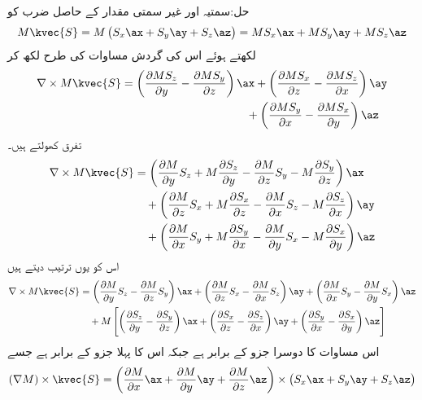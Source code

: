 حل:سمتیہ اور غیر سمتی مقدار کے حاصل ضرب کو
\begin{align*}
M \kvec{S}=M\left(S_x\ax+S_y\ay+S_z\az \right)=M S_x\ax+M S_y\ay+M S_z\az
\end{align*}
لکھتے ہوئے اس کی گردش مساوات  کی طرح لکھ کر
\begin{equation*}
\begin{split}
\nabla \times M\kvec{S}&=\left(\frac{\partial MS_z}{\partial y}-\frac{\partial MS_y}{\partial z} \right)\ax+\left( \frac{\partial MS_x}{\partial z}-\frac{\partial MS_z}{\partial x}\right)\ay \\
& \quad \quad \quad\quad \quad \quad\quad \quad \quad\quad \quad +\left(\frac{\partial MS_y}{\partial x}-\frac{\partial MS_x}{\partial y} \right)\az
\end{split}
\end{equation*}
تفرق کھولتے ہیں۔
\begin{align*}
\nabla \times M\kvec{S}&=\left(\frac{\partial M}{\partial y}S_z+M\frac{\partial S_z}{\partial y}-\frac{\partial M}{\partial z}S_y-M\frac{\partial S_y}{\partial z} \right)\ax\\
&\quad +\left( \frac{\partial M}{\partial z}S_x+M\frac{\partial S_x}{\partial z}-\frac{\partial M}{\partial x}S_z-M\frac{\partial S_z}{\partial x}\right)\ay \\
&\quad +\left(\frac{\partial M}{\partial x}S_y+M\frac{\partial S_y}{\partial x}-\frac{\partial M}{\partial y}S_x-M\frac{\partial S_x}{\partial y} \right)\az
\end{align*}
اس کو یوں ترتیب دیتے ہیں
\begin{align*}
\nabla \times M\kvec{S}&=\left(\frac{\partial M}{\partial y}S_z-\frac{\partial M}{\partial z}S_y\right)\ax+\left( \frac{\partial M}{\partial z}S_x-\frac{\partial M}{\partial x}S_z\right)\ay+\left(\frac{\partial M}{\partial x}S_y-\frac{\partial M}{\partial y}S_x\right)\az\\
&\quad +M\left[\left(\frac{\partial S_z}{\partial y}-\frac{\partial S_y}{\partial z} \right)\ax+\left(\frac{\partial S_x}{\partial z}-\frac{\partial S_z}{\partial x}\right)\ay +\left(\frac{\partial S_y}{\partial x}-\frac{\partial S_x}{\partial y} \right)\az\right]
\end{align*}
اس مساوات کا دوسرا جزو  کے برابر ہے جبکہ اس کا پہلا جزو  کے برابر ہے جسے 
\begin{align*}
\left(\nabla M\right) \times \kvec{S}=\left(\frac{\partial M}{\partial x}\ax+\frac{\partial M}{\partial y}\ay+\frac{\partial M}{\partial z}\az \right) \times \left(S_x \ax+S_y \ay +S_z \az \right)
\end{align*}
